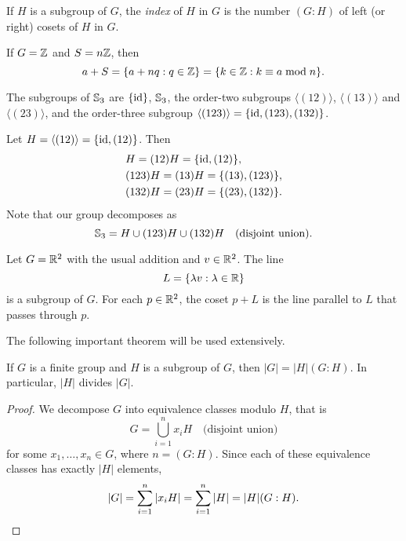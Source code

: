 \begin{definition}
    If $H$ is a subgroup of $G$, the \emph{index} of $H$ in $G$
    is the number $(G:H)$ of left (or right) cosets of $H$ in $G$. 
\end{definition}

\begin{example}
    If $G=\mathbb{Z}$ and $S=n\mathbb{Z}$, then 
    \[
    a+S=\{a+nq:q\in\mathbb{Z}\}=\{k\in\mathbb{Z}:k\equiv a\bmod n\}.
    \]
\end{example}
    
\begin{example}
    The subgroups of $\mathbb{S}_3$ are $\{\operatorname{id}\}$, $\mathbb{S}_3$, 
    the order-two subgroups 
    $\langle(12)\rangle$, 
    $\langle(13)\rangle$ and $\langle(23)\rangle$, and 
    the order-three subgroup $\langle(123)\rangle=\{\operatorname{id},(123),(132)\}$.  
    
    Let $H=\langle(12)\rangle=\{\operatorname{id},(12)\}$. Then 
    \begin{align*}
    &H=(12)H=\{\operatorname{id},(12)\},\\
    &(123)H=(13)H=\{(13),(123)\},\\
    &(132)H=(23)H=\{(23),(132)\}.
    \end{align*}
    Note that our group decomposes as 
    \[
    \mathbb{S}_3=H\cup (123)H\cup (132)H\quad\text{(disjoint union)}.
    \]
    \end{example}

    \begin{example}
        Let $G=\mathbb{R}^2$ with the usual addition 
        and $v\in\mathbb{R}^2$. The line 
        \[
        L=\{\lambda v:\lambda\in\mathbb{R}\}
        \]
        is a subgroup of $G$. For each 
        $p\in\mathbb{R}^2$, the coset $p+L$ 
        is the line parallel to $L$ that 
        passes through $p$.
    \end{example}

The following important theorem will be used extensively. 

\begin{theorem}[Lagrange]
    If $G$ is a finite group and $H$ is a subgroup of $G$, 
    then $|G|=|H|(G:H)$. In particular, $|H|$ divides $|G|$.
\end{theorem}

\begin{proof}
    We decompose $G$ into equivalence classes modulo $H$, that is 
    \[
    G=\bigcup_{i=1}^n x_iH\quad\text{(disjoint union)}
    \]
    for some $x_1,\dots,x_n\in G$, where $n=(G:H)$. 
    Since each of these equivalence classes has 
    exactly 
    $|H|$ elements,
    \[
            |G|=\sum_{i=1}^n|x_iH|=\sum_{i=1}^n|H|=|H|(G:H).\qedhere
    \]
\end{proof}

